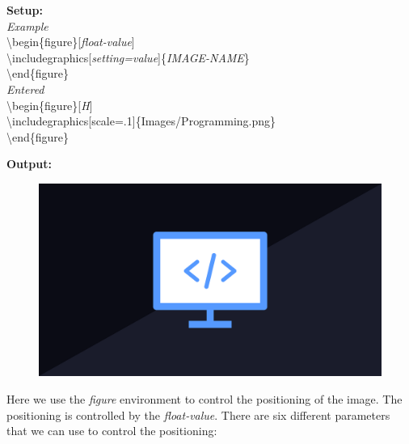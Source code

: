 \documentclass{article}
\newcommand{\bs}[1]{\textbackslash{}#1} %
\begin{document}
\begin{multicols}{2}
    \noindent
    \begin{minipage}{0.70\linewidth}
        \noindent
        \vspace{0.5em}
        {\large\textbf{Setup:}} \\
        \textit{Example} \\
        \bs{begin\{figure\}[\textit{float-value}]} \\
        \bs{includegraphics[\textit{setting=value}]\{\textit{IMAGE-NAME}\}} \\
        \bs{end\{figure\}} \\[1em] %

        \textit{Entered} \\
        \bs{begin\{figure\}[\textit{H}]} \\
        \bs{includegraphics[scale=.1]\{Images/Programming.png\}} \\
        \bs{end\{figure\}}
    \end{minipage}
    \columnbreak
   
        \noindent
        {\large\textbf{Output:}} \\
        \noindent
        \begin{figure}[H]
            \includegraphics[scale=0.05]{Images/Programming.png} %
            \label{fig:programming}
        \end{figure}
\end{multicols} %
Here we use the \textit{figure} environment to control the positioning of the image. The positioning is 
controlled by the \textit{float-value}. There are six different parameters that we can use to control the positioning:
\end{document}
